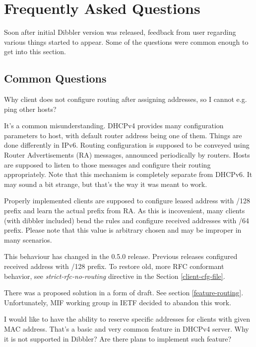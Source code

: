 
\newpage
\section{Frequently Asked Questions}

Soon after initial Dibbler version was released, feedback from user
regarding various things started to appear. Some of the questions were
common enough to get into this section.

\subsection{Common Questions}

\Q Why client does not configure routing after assigning addresses, so
I cannot e.g. ping other hosts?

\A It's a common misunderstanding. DHCPv4 provides many configuration
parameters to host, with default router address being one of
them. Things are done differently in IPv6. Routing configuration is
supposed to be conveyed using Router Advertisements (RA) messages,
announced periodically by routers. Hosts are supposed to listen to
those messages and configure their routing appropriately. Note that
this mechanism is completely separate from DHCPv6. It may sound a bit
strange, but that's the way it was meant to work.

Properly implemented clients are supposed to configure leased address
with /128 prefix and learn the actual prefix from RA. As this is
incovenient, many clients (with dibbler included) bend the rules and
configure received addresses with /64 prefix. Please note that this
value is arbitrary chosen and may be improper in many scenarios.

\Note This behaviour has changed in the 0.5.0 release. Previous
releases configured received address with /128 prefix. To restore old,
more RFC conformant behavior, see \emph{strict-rfc-no-routing}
directive in the Section \ref{client-cfg-file}.

There was a proposed solution in a form of \cite{draft-route-option}
draft. See section \ref{feature-routing}. Unfortunately, MIF working
group in IETF decided to abandon this work.

\Q I would like to have the ability to reserve specific addresses for
clients with given MAC address. That's a basic and very common feature
in DHCPv4 server. Why it is not supported in Dibbler? Are there plans
to implement such feature?

